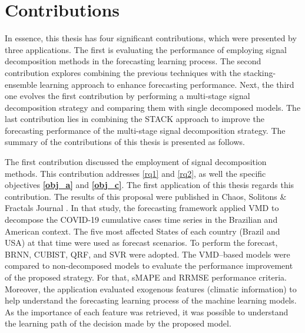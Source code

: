 \section{Contributions} \label{sec:contributions}

In essence, this thesis has four significant contributions, which were presented by three applications. The first is evaluating the performance of employing signal decomposition methods in the forecasting learning process. The second contribution explores combining the previous techniques with the stacking-ensemble learning approach to enhance forecasting performance. Next, the third one evolves the first contribution by performing a multi-stage signal decomposition strategy and comparing them with single decomposed models. The last contribution lies in combining the \ac{STACK} approach to improve the forecasting performance of the multi-stage signal decomposition strategy. The summary of the contributions of this thesis is presented as follows.

The first contribution discussed the employment of signal decomposition methods. This contribution addresses \ref{rq1} and \ref{rq2}, as well the specific objectives \textbf{\ref{obj_a}} and \textbf{\ref{obj_c}}. The first application of this thesis regards this contribution. The results of this proposal were published in Chaos, Solitons \& Fractals Journal \cite{dasilva2020Forecasting}. In that study, the forecasting framework applied \ac{VMD} to decompose the \ac{COVID-19} cumulative cases time series in the Brazilian and American context. The five most affected States of each country (Brazil and \ac{USA}) at that time were used as forecast scenarios. To perform the forecast, \ac{BRNN}, \ac{CUBIST}, \ac{QRF}, and \ac{SVR} were adopted. The \ac{VMD}--based models were compared to non-decomposed models to evaluate the performance improvement of the proposed strategy. For that, \ac{sMAPE} and \ac{RRMSE} performance criteria. Moreover, the application evaluated exogenous features (climatic information) to help understand the forecasting learning process of the machine learning models. As the importance of each feature was retrieved, it was possible to understand the learning path of the decision made by the proposed model.


